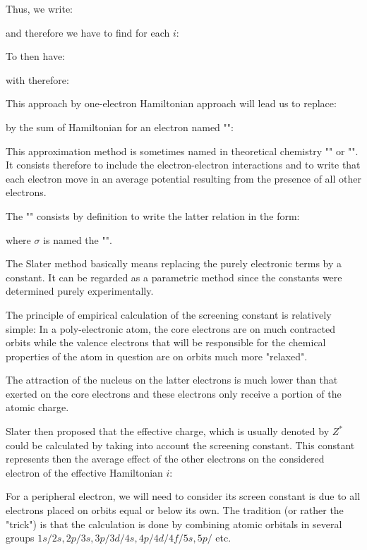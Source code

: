 	Thus, we write:
	
		and therefore we have to find for each $i$:
	
	To then have:
	
	with therefore:
	
	This approach by one-electron Hamiltonian approach will lead us to replace:
	
	by the sum of Hamiltonian for an electron named "":
	
	This approximation method is sometimes named in theoretical chemistry "" or "". It consists therefore to include the electron-electron interactions and to write that each electron move in an average potential resulting from the presence of all other electrons.
	
	The "" consists by definition to write the latter relation in the form:
	
	where $\sigma$ is named the "".
	
	The Slater method basically means replacing the purely electronic terms by a constant. It can be regarded as a parametric method since the constants were determined purely experimentally.
	
	The principle of empirical calculation of the screening constant is relatively simple: In a poly-electronic atom, the core electrons are on much contracted orbits  while the valence electrons that will be responsible for the chemical properties of the atom in question are on orbits much more "relaxed".
	
	The attraction of the nucleus on the latter electrons is much lower than that exerted on the core electrons and these electrons only receive a portion of the atomic charge.
	
	Slater then proposed that the effective charge, which is usually denoted by $Z^*$ could be calculated by taking into account the screening constant. This constant represents then the average effect of the other electrons on the considered electron  of the effective Hamiltonian $i$:
	
	For a peripheral electron, we will need to consider its screen constant is due to all electrons placed on orbits equal or below its own. The tradition (or rather the "trick") is that the calculation is done by combining atomic orbitals in several groups $1s/2s, 2p/3s, 3p/3d/4s, 4p/4d/4f/5s, 5p/$ etc.
	
